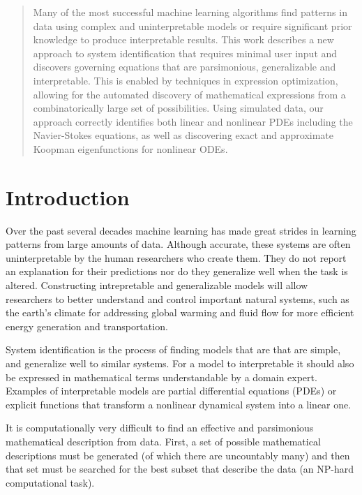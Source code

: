 \documentclass{article}
\begin{document}
\begin{abstract}
Many of the most successful machine learning algorithms  find patterns in data using complex and uninterpretable models or require significant prior knowledge to produce interpretable results. This work describes a new approach to system identification that requires minimal user input and discovers governing equations that are parsimonious, generalizable and interpretable. This is enabled by techniques in expression optimization, allowing for the automated discovery of mathematical expressions from a combinatorically large set of possibilities. Using simulated data, our approach correctly identifies both linear and nonlinear PDEs including the Navier-Stokes equations, as well as discovering exact and approximate Koopman eigenfunctions for nonlinear ODEs. 
\end{abstract}

\section{Introduction}
\label{introduction}

Over the past several decades machine learning has made great strides in learning patterns from large amounts of data. Although accurate, these systems are often uninterpretable by the human researchers who create them. They do not report an explanation for their predictions nor do they generalize well when the task is altered. Constructing intrepretable and generalizable models will allow researchers to better understand and control important natural systems, such as the earth’s climate for addressing global warming and fluid flow for more efficient energy generation and transportation. 

System identification is the process of finding models that are that are simple, and generalize well to similar systems. For a model to interpretable it should also be expressed in mathematical terms understandable by a domain expert. Examples of interpretable models are partial differential equations (PDEs) or explicit functions that transform a nonlinear dynamical system into a linear one. 

It is computationally very difficult to find an effective and parsimonious mathematical description from data. First, a set of possible mathematical descriptions must be generated (of which there are uncountably many) and then that set must be searched for the best subset that describe the data (an NP-hard computational task).
 
\end{document}
